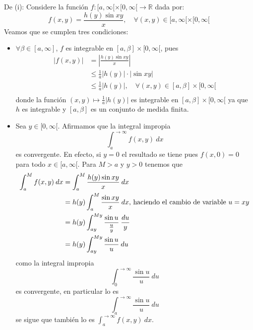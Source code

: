 \documentclass[12pt]{report}
\newcounter{it}
\theoremstyle{largebreak}
\renewcommand{\leq}{\ensuremath{\leqslant}}
\newcommand\abs[1]{\ensuremath{\left|#1\right|}}
\newcommand\cf[3]{\ensuremath{#1:#2\rightarrow#3}}
\begin{document}
    \begin{sol}
        De (i): Considere la función $\cf{f}{[a,\infty[\times[0,\infty[}{\mathbb{R}}$ dada por:
        \begin{equation*}
            f(x,y)=\frac{h(y)\sin xy}{x},\quad\forall (x,y)\in[a,\infty[\times[0,\infty[
        \end{equation*}
        Veamos que se cumplen tres condiciones:
        \begin{itemize}
            \item $\forall \beta\in[a,\infty]$, $f$ es integrable en $[a,\beta]\times[0,\infty[$, pues
            \begin{equation*}
                \begin{split}
                    \abs{f(x,y)}&=\abs{\frac{h(y)\sin xy}{x}}\\
                    &\leq\frac{1}{a}\abs{h(y)}\cdot\abs{\sin xy}\\
                    &\leq\frac{1}{a}\abs{h(y)},\quad\forall (x,y)\in[a,\beta]\times[0,\infty[\\
                \end{split}
            \end{equation*}
            donde la función $(x,y)\mapsto\frac{1}{a}\abs{h(y)}$ es integrable en $[a,\beta]\times[0,\infty[$ ya que $h$ es integrable y $[a,\beta]$ es un conjunto de medida finita.

            \item Sea $y\in[0,\infty[$. Afirmamos que la integral impropia
            \begin{equation*}
                \int_a^{ \rightarrow\infty}f(x,y)\:dx
            \end{equation*}
            es convergente. En efecto, si $y=0$ el resultado se tiene pues $f(x,0)=0$ para todo $x\in[a,\infty[$. Para $M>a$ y $y>0$ tenemos que
            \begin{equation*}
                \begin{split}
                    \int_a^{M}f(x,y)\:dx&=\int_a^{M}\frac{h(y)\sin xy}{x}\:dx\\
                    &=h(y)\int_{a}^{M}\frac{\sin xy}{x}\:dx\textup{, haciendo el cambio de variable }u=xy\\
                    &=h(y)\int_{ ay}^{ My}\frac{\sin u}{\frac{u}{y}}\:\frac{du}{y}\\
                    &=h(y)\int_{ ay}^{ My}\frac{\sin u}{u}\:du\\
                \end{split}
            \end{equation*}
            como la integral impropia
            \begin{equation*}
                \int_{ 0}^{ \rightarrow\infty}\frac{\sin u}{u}\:du
            \end{equation*}
            es convergente, en particular lo es
            \begin{equation*}
                \int_{a}^{ \rightarrow\infty}\frac{\sin u}{u}\:du
            \end{equation*}
            se sigue que también lo es $\int_a^{\rightarrow\infty}f(x,y)\:dx$.


\end{itemize}
\end{sol}
\end{document}
